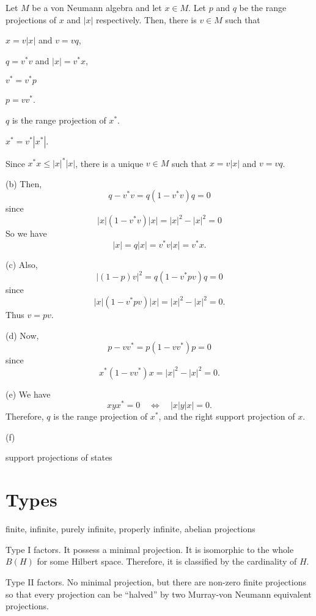 \documentclass{../../large}
\begin{document}
\begin{prb}
Let $M$ be a von Neumann algebra and let $x\in M$.
Let $p$ and $q$ be the range projections of $x$ and $|x|$ respectively.
Then, there is $v\in M$ such that
\begin{parts}
\item $x=v|x|$ and $v=vq$,
\item $q=v^*v$ and $|x|=v^*x$,
\item $v^*=v^*p$
\item $p=vv^*$.
\item $q$ is the range projection of $x^*$.
\item $x^*=v^*|x^*|$.
\end{parts}
\end{prb}
\begin{pf}
Since $x^*x\le|x|^*|x|$, there is a unique $v\in M$ such that $x=v|x|$ and $v=vq$.

(b)
Then,
\[q-v^*v=q(1-v^*v)q=0\]
since
\[|x|(1-v^*v)|x|=|x|^2-|x|^2=0\]
So we have
\[|x|=q|x|=v^*v|x|=v^*x.\]

(c)
Also,
\[|(1-p)v|^2=q(1-v^*pv)q=0\]
since
\[|x|(1-v^*pv)|x|=|x|^2-|x|^2=0.\]
Thus $v=pv$.

(d)
Now,
\[p-vv^*=p(1-vv^*)p=0\]
since
\[x^*(1-vv^*)x=|x|^2-|x|^2=0.\]

(e)
We have
\[xyx^*=0\quad\Leftrightarrow\quad |x|y|x|=0.\]
Therefore, $q$ is the range projection of $x^*$, and the right support projection of $x$.

(f)

\end{pf}


support projections of states




\section{Types}

finite, infinite, purely infinite, properly infinite, abelian projections






\bigskip
Type I factors.
It possess a minimal projection.
It is isomorphic to the whole $B(H)$ for some Hilbert space.
Therefore, it is classified by the cardinality of $H$.

Type II factors.
No minimal projection, but there are non-zero finite projections so that every projection can be ``halved'' by two Murray-von Neumann equivalent projections.
\end{document}
